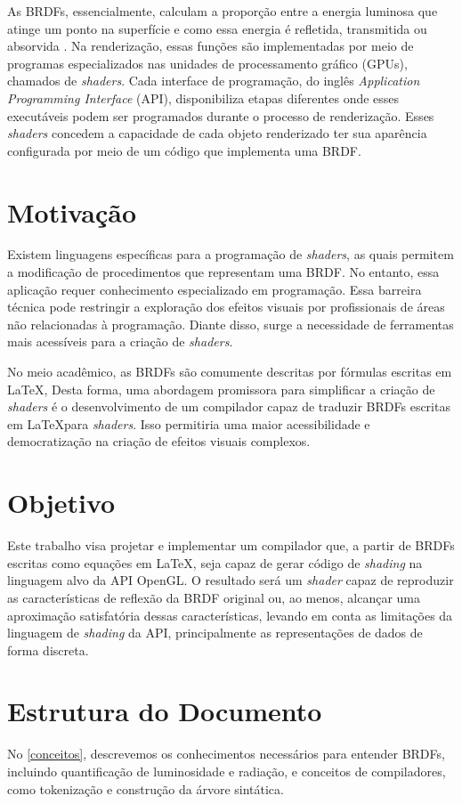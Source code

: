 \documentclass[english, 
               brazil, 
               bsc] %
               {dcomp-abntex2}
\begin{document}
As BRDFs, essencialmente, calculam a proporção entre a energia luminosa que atinge um ponto na superfície e como essa energia é refletida, transmitida ou absorvida \cite{pbr}. Na renderização, essas funções são implementadas por meio de programas especializados nas unidades de processamento gráfico (GPUs), chamados de \textit{shaders}. Cada interface de programação, do inglês \textit{ Application Programming Interface} (API),  disponibiliza etapas diferentes onde esses executáveis podem ser programados durante o processo de renderização. Esses \textit{shaders} concedem a capacidade de cada objeto renderizado ter sua aparência configurada por meio de um código que implementa uma BRDF.


\section{Motivação}


Existem linguagens específicas para a programação de \textit{shaders}, as quais permitem a modificação de procedimentos que representam uma BRDF. No entanto, essa aplicação requer conhecimento especializado em programação. Essa barreira técnica pode restringir a exploração dos efeitos visuais por profissionais de áreas não relacionadas à programação. Diante disso, surge a necessidade de ferramentas mais acessíveis para a criação de \textit{shaders}.

No meio acadêmico, as BRDFs são comumente descritas por fórmulas escritas em \LaTeX, Desta forma, uma abordagem promissora para simplificar a criação de \textit{shaders} é o desenvolvimento de um compilador capaz de traduzir BRDFs   escritas em \LaTeX  para \textit{shaders}. Isso permitiria uma maior acessibilidade e democratização na criação de efeitos visuais complexos.

\section{Objetivo}
Este trabalho visa projetar e implementar um compilador que, a partir de BRDFs escritas como equações em \LaTeX, seja capaz de gerar código de \textit{shading} na linguagem alvo da API OpenGL. O resultado será um \textit{shader} capaz de reproduzir as características de reflexão da BRDF original ou, ao menos, alcançar uma aproximação satisfatória dessas características, levando em conta as limitações da linguagem de \textit{shading} da API, principalmente as representações de dados de forma discreta. 

\section{Estrutura do Documento}
No \autoref{conceitos}, descrevemos os conhecimentos necessários para entender BRDFs, incluindo quantificação de luminosidade e radiação, e  conceitos de compiladores, como tokenização e construção da árvore sintática.
\end{document}
